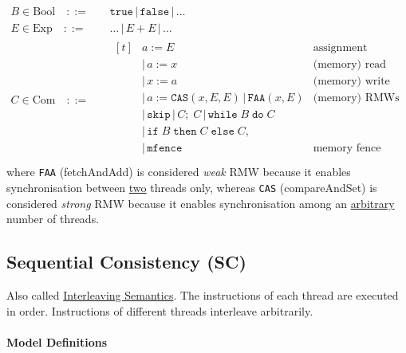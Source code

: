 \documentclass[twocolumn,landscape,10pt]{article}
\theoremstyle{definition}
\begin{document}
\begin{align*}
    B\in \text{Bool}\quad::=& \quad\texttt{true} \,|\, \texttt{false} \,|\, \ldots \\
    E\in \text{Exp}\quad::=&\quad\ldots \,|\, E + E \,|\, \ldots \\
    C\in \text{Com}\quad::=&\quad
    \begin{aligned}[t]
        & a := E & \text{assignment} \\
        & |\,a := x & \text{(memory) read} \\
        & |\,x := a & \text{(memory) write} \\
        & |\,a := \texttt{CAS}(x,E,E)\,|\,\texttt{FAA}(x,E) & \text{(memory) RMWs} \\
        & |\,\texttt{skip}\,|\,C;\;C\,|\,\texttt{while}\;B\;\texttt{do}\;C & \\
        & |\,\texttt{if}\;B\;\texttt{then}\;C\;\texttt{else}\;C, & \\
        & |\,\texttt{mfence} & \text{memory fence (TSO only)} \\
    \end{aligned}
\end{align*} 
where \texttt{FAA} (fetchAndAdd) is considered \emph{weak}
RMW because it enables synchronisation between \underline{two} threads only,
whereas \texttt{CAS} (compareAndSet) is considered \emph{strong} RMW because it
enables synchronisation among an \underline{arbitrary} number of threads.


\subsection{Sequential Consistency (SC)}

Also called \underline{Interleaving Semantics}. 
The instructions of each thread are executed in order.
Instructions of different threads interleave arbitrarily.


\paragraph{Model Definitions}
\end{document}
